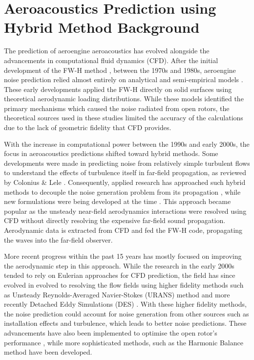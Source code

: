 \section{Aeroacoustics Prediction using Hybrid Method Background} \label{sec:noise_prediction_history}
The prediction of aeroengine aeroacoustics has evolved alongside the advancements in computational fluid dynamics (CFD). After the initial development of the FW-H method \cite{Ffowcs1969, FfowcsWilliams1969}, between the 1970s and 1980s, aeroengine noise prediction relied almost entirely on analytical and semi-empirical models \cite{Farassat1977, WoanGregorek1978, Hanson1985, Parry1988}. These early developments applied the FW-H directly on solid surfaces using theoretical aerodynamic loading distributions. While these models identified the primary mechanisms which caused the noise radiated from open rotors, the theoretical sources used in these studies limited the accuracy of the calculations due to the lack of geometric fidelity that CFD provides.

With the increase in computational power between the 1990s and early 2000s, the focus in aeroacoustics predictions shifted toward hybrid methods. Some developments were made in predicting noise from relatively simple turbulent flows to understand the effects of turbulence itself in far-field propagation, as reviewed by Colonius \& Lele \cite{Colonius2004}. Consequently, applied research has approached such hybrid methods to decouple the noise generation problem from its propagation \cite{Pricur1996, brentner1996, Brentner2003, Morgans2004, Maaloum2004}, while new formulations were being developed at the time \cite{Francescantonio1997, Brentner1997, casalino-2001}. This approach became popular as the unsteady near-field aerodynamics interactions were resolved using CFD without directly resolving the expensive far-field sound propagation. Aerodynamic data is extracted from CFD and fed the FW-H code, propagating the waves into the far-field observer.

More recent progress within the past 15 years has mostly focused on improving the aerodynamic step in this approach. While the research in the early 2000s tended to rely on Eulerian approaches for CFD prediction, the field has since evolved in evolved to resolving the flow fields using higher fidelity methods such as Unsteady Reynolds-Averaged Navier-Stokes (URANS) method \cite{Sharma2013, Dunn2014, Envia2014, Stuermeretal2016} and more recently Detached Eddy Simulations (DES) \cite{Mohan2025, Fan2025}. With these higher fidelity methods, the noise prediction could account for noise generation from other sources such as installation effects and turbulence, which leads to better noise predictions. These advancements have also been implemented to optimise the open rotor's performance \cite{Lepotetal2011}, while more sophisticated methods, such as the Harmonic Balance method \cite{Lindbladetal2018} have been developed.

